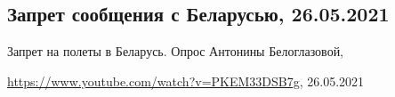  
 
 
 
 
\subsection{Запрет сообщения с Беларусью, 26.05.2021}

Запрет на полеты в Беларусь. Опрос Антонины Белоглазовой,\par
\url{https://www.youtube.com/watch?v=PKEM33DSB7g}, 26.05.2021

